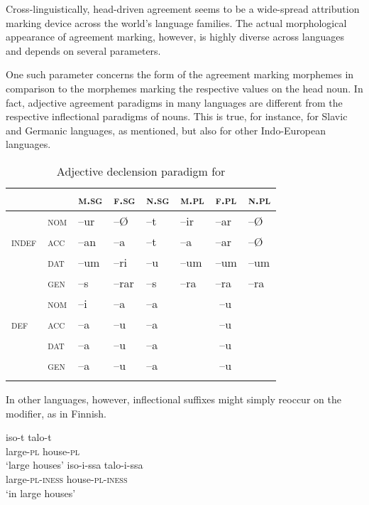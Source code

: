 Cross-linguistically, head-driven agreement seems to be a wide-spread attribution marking device across the world's language families. The actual morphological appearance of agreement marking, however, is highly diverse across languages and depends on several parameters.

One such parameter concerns the form of the agreement marking morphemes in comparison to the morphemes marking the respective values on the head noun. In fact, adjective agreement paradigms in many languages are different from the respective inflectional paradigms of nouns. This is true, for instance, for Slavic and Germanic languages, as mentioned, but also for other Indo-European languages. 
\begin{table}
  \begin{tabular}{l l | l l l | l l l}
    \lsptoprule
		&		&\textsc{m.sg}&\textsc{f.sg}&\textsc{n.sg}&\textsc{m.pl}&\textsc{f.pl}&\textsc{n.pl}\\
		\midrule
		&\textsc{nom}	&–ur		&–Ø	&–t		&–ir		&–ar		&–Ø \\
\textsc{indef}	&\textsc{acc}	&–an		&–a	&–t		&–a		&–ar		&–Ø \\
		&\textsc{dat}	&–um		&–ri	&–u		& –um&–um&–um\\
		&\textsc{gen}	&–s		&–rar	&–s		& –ra&–ra&–ra\\
		\midrule
		&\textsc{nom}	&–i		&–a		&–a		&\multicolumn{3}{c}{–u}\\
\textsc{def}	&\textsc{acc}	&–a		&–u		&–a		&\multicolumn{3}{c}{–u}\\
		&\textsc{dat}	&–a		&–u		&–a		&\multicolumn{3}{c}{–u}\\
		&\textsc{gen}	&–a		&–u		&–a		&\multicolumn{3}{c}{–u}\\
\lspbottomrule
\end{tabular}
\caption[Adjective paradigm for \textsc{Icelandic}]{Adjective declension paradigm for } \label{icelandic agr}
\end{table}
In other languages, however, inflectional suffixes might simply reoccur on the modifier, as in Finnish.
\begin{exe}
\ex 
{} \label{finnish agr.}
\begin{xlist}
\ex
\gll 	iso-t		talo-t\\
	large-\textsc{pl}	house-\textsc{pl}\\
\glt	‘large houses’
\ex
\gll 	iso-i-ssa		talo-i-ssa\\
	large-\textsc{pl}-\textsc{iness} house-\textsc{pl}-\textsc{iness}\\
\glt	‘in large houses’
\end{xlist}
\end{exe}
